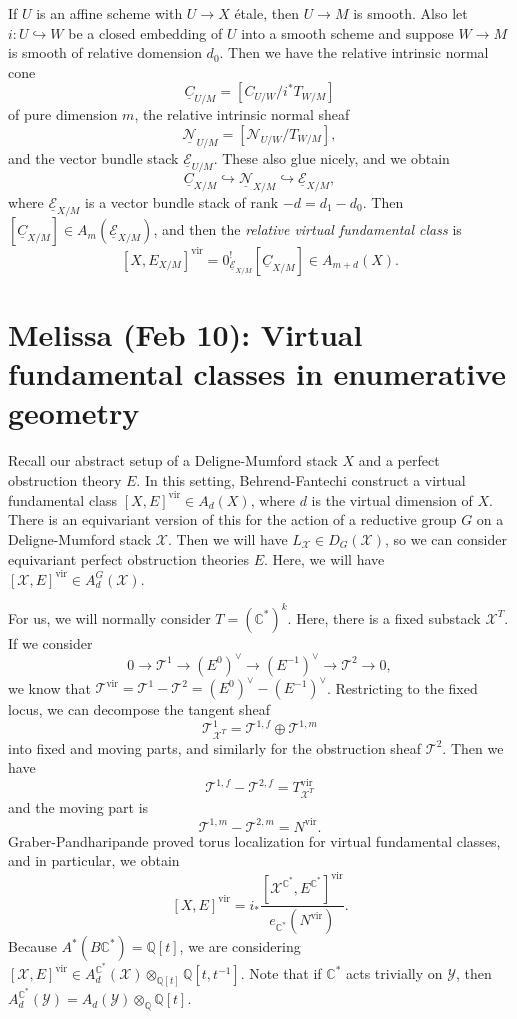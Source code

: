 \documentclass[leqno, openany]{memoir}
\theoremstyle{definition}
\theoremstyle{remark}
\theoremstyle{plain}
\theoremstyle{definition}
\theoremstyle{remark}
\newcommand{\C}{\mathbb{C}}
\newcommand{\Q}{\mathbb{Q}}
\newcommand{\mc}[1]{\mathcal{#1}}
\newcommand{\mr}[1]{\mathrm{#1}}
\newcommand{\ul}[1]{\underline{#1}}
\begin{document}
If $U$ is an affine scheme with $U \to X$ \'etale, then $U \to M$ is smooth. Also let $i \colon U \hookrightarrow W$ be a closed embedding of $U$ into a smooth scheme and suppose $W \to M$ is smooth of relative domension $d_0$. Then we have the relative intrinsic normal cone
\[ \ul{C}_{U/M} = [C_{U/W} / i^* T_{W/M}] \]
of pure dimension $m$, the relative intrinsic normal sheaf
\[ \ul{\mc{N}}_{U/M} = [\mc{N}_{U/W} / T_{W/M}], \]
and the vector bundle stack $\ul{\mc{E}}_{U/M}$. These also glue nicely, and we obtain
\[ \ul{C}_{X/M} \hookrightarrow \ul{\mc{N}}_{X/M} \hookrightarrow \ul{\mc{E}}_{X/M}, \]
where $\ul{\mc{E}}_{X/M}$ is a vector bundle stack of rank $-d = d_1 - d_0$. Then $[\ul{C}_{X/M}] \in A_m(\ul{\mc{E}}_{X/M})$, and then the \textit{relative virtual fundamental class} is
\[ [X, E_{X/M}]^{\mr{vir}} = 0_{\ul{\mc{E}}_{X/M}}^! [\ul{C}_{X/M}] \in A_{m+d}(X). \]

\chapter{Melissa (Feb 10): Virtual fundamental classes in enumerative geometry}%

Recall our abstract setup of a Deligne-Mumford stack $X$ and a perfect obstruction theory $E$. In this setting, Behrend-Fantechi construct a virtual fundamental class $[X, E]^{\mr{vir}} \in A_d(X)$, where $d$ is the virtual dimension of $X$. There is an equivariant version of this for the action of a reductive group $G$ on a Deligne-Mumford stack $\mc{X}$. Then we will have $L_{\mc{X}} \in D_G(\mc{X})$, so we can consider equivariant perfect obstruction theories $E$. Here, we will have $[\mc{X}, E]^{\mr{vir}} \in A_d^G(\mc{X})$.

For us, we will normally consider $T = (\C^*)^k$. Here, there is a fixed substack $\mc{X}^T$. If we consider
\[ 0 \to \mc{T}^1 \to (E^0)^{\vee} \to (E^{-1})^{\vee} \to \mc{T}^2 \to 0, \]
we know that $\mc{T}^{\mr{vir}} = \mc{T}^1 - \mc{T}^2 = (E^0)^{\vee} - (E^{-1})^{\vee}$. Restricting to the fixed locus, we can decompose the tangent sheaf 
\[ \mc{T}^1_{\mc{X}^T} = \mc{T}^{1,f} \oplus \mc{T}^{1,m} \]
into fixed and moving parts, and similarly for the obstruction sheaf $\mc{T}^2$. Then we have
\[ \mc{T}^{1,f} - \mc{T}^{2,f} = T_{\mc{X}^T}^{\mr{vir}} \]
and the moving part is
\[ \mc{T}^{1,m} - \mc{T}^{2,m} = N^{\mr{vir}}. \]
Graber-Pandharipande proved torus localization for virtual fundamental classes, and in particular, we obtain
\[ [X,E]^{\mr{vir}} = i_* \frac{[\mc{X}^{\C^*}, E^{\C^*}]^{\mr{vir}}}{e_{\C^*}(N^{\mr{vir}})}. \]
Because $A^* (B\C^*) = \Q[t]$, we are considering $[\mc{X}, E]^{\mr{vir}} \in A_d^{\C^*} (\mc{X}) \otimes_{\Q[t]} \Q[t, t^{-1}]$. Note that if $\C^*$ acts trivially on $\mc{Y}$, then $A_d^{\C^*}(\mc{Y}) = A_d(\mc{Y}) \otimes_{\Q} \Q[t]$.
\end{document}
